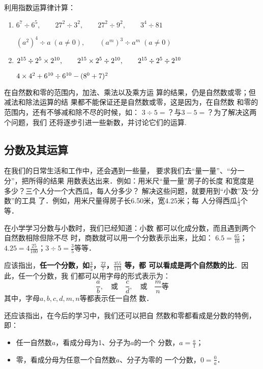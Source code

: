 \begin{ex}
利用指数运算律计算：
\begin{enumerate}
    \item $6^7\div 6^5,\qquad 27^2\div 3^2,\qquad 27^2\div 9^2,\qquad 3^4\div 81$
    
    $(a^2)^4\div a\; (a\ne 0),\qquad (a^m)^3\div a^m\; (a\ne 0)$
    \item $2^{15}\div 2^5\times 2^{10},\qquad 2^{15}\times 2^5\div 2^{10},\qquad 2^{15}\div 2^5\div 2^{10}$
    
    $4\times 4^2 +6^{10}\div 6^{10}-(8^0+7)^2$
\end{enumerate}
\end{ex}

在自然数和零的范围内，加法、乘法以及乘方运
算的结果，仍是自然数或零；但减法和除法运算的结
果都不能保证还是自然数或零，这是因为，在自然数
和零的范围内，还有不够减和除不尽的时候，如：
$3\div 5=$？与$3-5=$？为了解决这两个问题，我们
还将逐步引进一些新数，并讨论它们的运算.

\subsection{分数及其运算}

在我们的日常生活和工作中，还会遇到一些量，
要求我们去“量一量”、“分一分”，把所得的结果
用数表达出来．例如：用米尺“量一量”房子的长度
和宽度是多少？三个人分一个大西瓜，每人分多少？
解决这些问题，就要用到“小数”及“分数”的工具
了．例如，用米尺量得房子长6.50米，宽4.25米；每
人分得西瓜$\frac{1}{3}$个等．

在小学学习分数与小数时，我们已经知道：小数
都可以化成分数，而且遇到两个自然数相除但除不尽
时，商数就可以用一个分数表示出来，比如：
$6.5=\frac{65}{10}$；$4.25=4\frac{25}{100}$；$3\div 5=\frac{3}{5}$等等．

应该指出，\textbf{任一个分数，如$\frac{3}{5}$，$\frac{22}{7}$，$\frac{355}{113}$
等，都
可以看成是两个自然数的比}．因此，任一个分数，我
们都可以用字母的形式表示为：
\[\frac{a}{b},\quad \text{或}\quad \frac{c}{d}, \quad \text{或} \quad \frac{m}{n} \text{等} \]
其中，字母$a, b, c, d, m,n$等都表示任一自然
数．

    还应该指出，在今后的学习中，我们还可以把自
然数和零都看成是分数的特例，即：
\begin{itemize}
    \item 任一自然数$a$，看成分母为1、分子为$a$的一个
    分数，$a=\frac{a}{1}$；
    \item 零，看成分母为任意一个自然数$a$、分子为零的
    一个分数，$0=\frac{0}{a}$．
\end{itemize}

